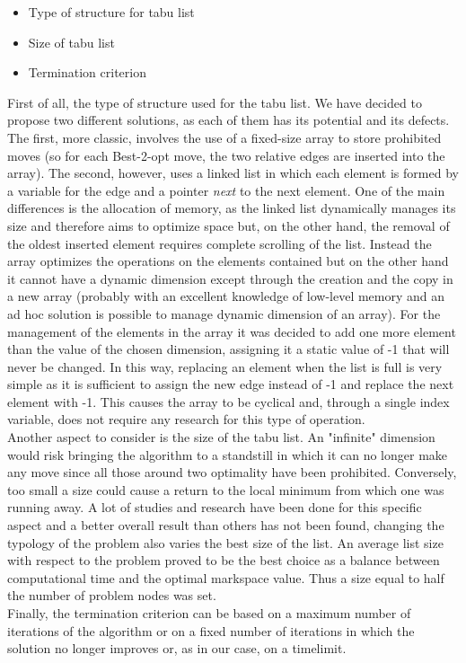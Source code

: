 \begin{itemize}
\item Type of structure for tabu list
\item Size of tabu list
\item Termination criterion
\end{itemize}

First of all, the type of structure used for the tabu list. We have decided to propose two different solutions, as each of them has its potential and its defects. The first, more classic, involves the use of a fixed-size array to store prohibited moves (so for each Best-2-opt move, the two relative edges are inserted into the array). The second, however, uses a linked list in which each element is formed by a variable for the edge and a pointer \textit{next} to the next element.
One of the main differences is the allocation of memory, as the linked list dynamically manages its size and therefore aims to optimize space but, on the other hand, the removal of the oldest inserted element requires complete scrolling of the list. Instead the array optimizes the operations on the elements contained but on the other hand it cannot have a dynamic dimension except through the creation and the copy in a new array (probably with an excellent knowledge of low-level memory and an ad hoc solution is possible to manage dynamic dimension of an array). For the management of the elements in the array it was decided to add one more element than the value of the chosen dimension, assigning it a static value of -1 that will never be changed. In this way, replacing an element when the list is full is very simple as it is sufficient to assign the new edge instead of -1 and replace the next element with -1. This causes the array to be cyclical and, through a single index variable, does not require any research for this type of operation.\\
Another aspect to consider is the size of the tabu list. An "infinite" dimension would risk bringing the algorithm to a standstill in which it can no longer make any move since all those around two optimality have been prohibited. Conversely, too small a size could cause a return to the local minimum from which one was running away. A lot of studies and research have been done for this specific aspect \cite{Nababan_2019, Tsubakitani1998} and a better overall result than others has not been found, changing the typology of the problem also varies the best size of the list. An average list size with respect to the problem proved to be the best choice as a balance between computational time and the optimal markspace value. Thus a size equal to half the number of problem nodes was set.\\
Finally, the termination criterion can be based on a maximum number of iterations of the algorithm or on a fixed number of iterations in which the solution no longer improves or, as in our case, on a timelimit.

